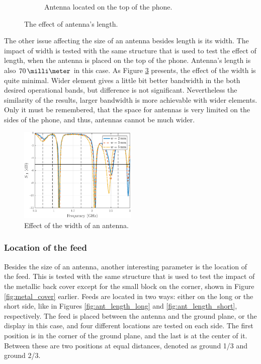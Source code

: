 \begin{figure}[H]
\begin{subfigure}[b]{0.49\textwidth}
        \caption{Antenna located on the top of the phone.}
        \label{fig:ant_length_short_res}
    \end{subfigure}
    \caption{The effect of antenna's length.}
    \label{fig:ant_length_result}
\end{figure}

The other issue affecting the size of an antenna besides length is its width. The impact of width is tested with the same structure that is used to test the effect of length, when the antenna is placed on the top of the phone. Antenna's length is also $70\,\milli\meter$ in this case. As Figure \ref{fig:width_res} presents, the effect of the width is quite minimal. Wider element gives a little bit better bandwidth in the both desired operational bands, but difference is not significant. Nevertheless the similarity of the results, larger bandwidth is more achievable with wider elements. Only it must be remembered, that the space for antennas is very limited on the sides of the phone, and thus, antennas cannot be much wider.

\begin{figure}[H]
    \centering
    \includegraphics[width=0.5\textwidth]{img/width_res.eps}
    \caption{Effect of the width of an antenna.}
    \label{fig:width_res}
\end{figure}


\subsubsection{Location of the feed}
\label{sec:feed}
Besides the size of an antenna, another interesting parameter is the location of the feed. This is tested with the same structure that is used to test the impact of the metallic back cover except for the small block on the corner, shown in Figure \ref{fig:metal_cover} earlier. Feeds are located in two ways: either on the long or the short side, like in Figures \ref{fig:ant_length_long} and \ref{fig:ant_length_short}, respectively. The feed is placed between the antenna and the ground plane, or the display in this case, and four different locations are tested on each side. The first position is in the corner of the ground plane, and the last is at the center of it. Between these are two positions at equal distances, denoted as ground 1/3 and ground 2/3.

